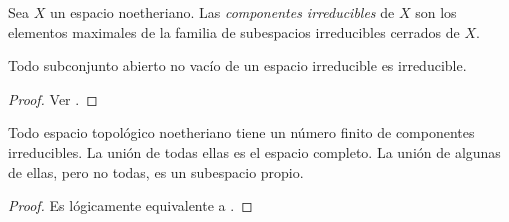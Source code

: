 \begin{definition}
Sea $X$ un espacio noetheriano. Las \textit{componentes irreducibles} de $X$ son los elementos maximales de la familia de subespacios irreducibles cerrados de $X$.
\end{definition}

\begin{proposition}
Todo subconjunto abierto no vacío de un espacio irreducible es irreducible.
\end{proposition}

\begin{proof}
Ver \cite[p. 3]{hartshorne}.
\end{proof}

\begin{proposition}
Todo espacio topológico noetheriano tiene un número finito de componentes irreducibles. La unión de todas ellas es el espacio completo. La unión de algunas de ellas, pero no todas, es un subespacio propio.
\end{proposition}

\begin{proof}
Es lógicamente equivalente a \cite[p. 5]{hartshorne}.
\end{proof}
